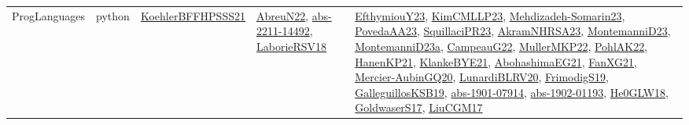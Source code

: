 {\begin{longtable}{llp{6cm}p{6cm}p{6cm}}
ProgLanguages & python & \href{articles/KoehlerBFFHPSSS21.pdf}{KoehlerBFFHPSSS21}\cite{KoehlerBFFHPSSS21} & \href{articles/AbreuN22.pdf}{AbreuN22}\cite{AbreuN22}, \href{articles/abs-2211-14492.pdf}{abs-2211-14492}\cite{abs-2211-14492}, \href{articles/LaborieRSV18.pdf}{LaborieRSV18}\cite{LaborieRSV18} & \href{papers/EfthymiouY23.pdf}{EfthymiouY23}\cite{EfthymiouY23}, \href{papers/KimCMLLP23.pdf}{KimCMLLP23}\cite{KimCMLLP23}, \href{papers/Mehdizadeh-Somarin23.pdf}{Mehdizadeh-Somarin23}\cite{Mehdizadeh-Somarin23}, \href{papers/PovedaAA23.pdf}{PovedaAA23}\cite{PovedaAA23}, \href{papers/SquillaciPR23.pdf}{SquillaciPR23}\cite{SquillaciPR23}, \href{articles/AkramNHRSA23.pdf}{AkramNHRSA23}\cite{AkramNHRSA23}, \href{articles/MontemanniD23.pdf}{MontemanniD23}\cite{MontemanniD23}, \href{articles/MontemanniD23a.pdf}{MontemanniD23a}\cite{MontemanniD23a}, \href{articles/CampeauG22.pdf}{CampeauG22}\cite{CampeauG22}, \href{articles/MullerMKP22.pdf}{MullerMKP22}\cite{MullerMKP22}, \href{articles/PohlAK22.pdf}{PohlAK22}\cite{PohlAK22}, \href{papers/HanenKP21.pdf}{HanenKP21}\cite{HanenKP21}, \href{papers/KlankeBYE21.pdf}{KlankeBYE21}\cite{KlankeBYE21}, \href{articles/AbohashimaEG21.pdf}{AbohashimaEG21}\cite{AbohashimaEG21}, \href{articles/FanXG21.pdf}{FanXG21}\cite{FanXG21}, \href{papers/Mercier-AubinGQ20.pdf}{Mercier-AubinGQ20}\cite{Mercier-AubinGQ20}, \href{articles/LunardiBLRV20.pdf}{LunardiBLRV20}\cite{LunardiBLRV20}, \href{papers/FrimodigS19.pdf}{FrimodigS19}\cite{FrimodigS19}, \href{papers/GalleguillosKSB19.pdf}{GalleguillosKSB19}\cite{GalleguillosKSB19}, \href{articles/abs-1901-07914.pdf}{abs-1901-07914}\cite{abs-1901-07914}, \href{articles/abs-1902-01193.pdf}{abs-1902-01193}\cite{abs-1902-01193}, \href{papers/He0GLW18.pdf}{He0GLW18}\cite{He0GLW18}, \href{papers/GoldwaserS17.pdf}{GoldwaserS17}\cite{GoldwaserS17}, \href{papers/LiuCGM17.pdf}{LiuCGM17}\cite{LiuCGM17}\\

\end{longtable}}
